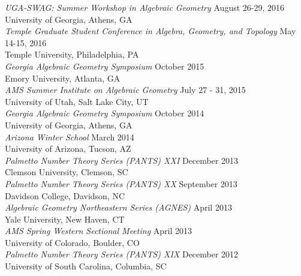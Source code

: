 \documentclass{article}
\begin{document}
\noindent\textsl{UGA-SWAG: Summer Workshop in Algebraic Geometry} \hfill August 26-29, 2016\\
University of Georgia, Athens, GA\\

\noindent\textsl{Temple Graduate Student Conference in Algebra, Geometry, and Topology} \hfill May 14-15, 2016\\
Temple University, Philadelphia, PA\\

\noindent\textsl{Georgia Algebraic Geometry Symposium} \hfill October 2015\\
Emory University, Atlanta, GA\\

\noindent\textsl{AMS Summer Institute on Algebraic Geometry} \hfill July 27 - 31, 2015\\
University of Utah, Salt Lake City, UT\\

\noindent\textsl{Georgia Algebraic Geometry Symposium} \hfill October 2014\\
University of Georgia, Athens, GA\\

\noindent\textsl{Arizona Winter School} \hfill March 2014\\
University of Arizona, Tucson, AZ\\

\noindent\textsl{Palmetto Number Theory Series (PANTS) XXI} \hfill December 2013\\
Clemson University, Clemson, SC\\

\noindent\textsl{Palmetto Number Theory Series (PANTS) XX} \hfill September 2013\\
Davidson College, Davidson, NC\\

\noindent\textsl{Algebraic Geometry Northeastern Series (AGNES)} \hfill April 2013\\
Yale University, New Haven, CT\\

\noindent\textsl{AMS Spring Western Sectional Meeting} \hfill April 2013\\
University of Colorado, Boulder, CO\\

\noindent\textsl{Palmetto Number Theory Series (PANTS) XIX} \hfill December 2012\\
University of South Carolina, Columbia, SC\\
\end{document}
